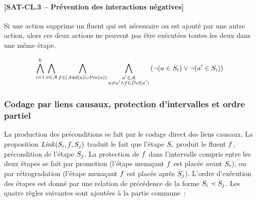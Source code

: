 {%

\paragraph*{[SAT-CL.3 -- Prévention des interactions négatives]}
Si une action supprime un fluent qui est nécessaire ou est ajouté par une autre action, alors ces deux actions ne peuvent pas être exécutées toutes les deux dans une même étape.

\begin{small}
\[
\bigwedge\limits_{\substack{i=1}}^{k}\bigwedge\limits_{\substack{\substack{a\in \mathcal{A}}}}\bigwedge\limits_{\substack{\substack{f\in \left(\mathit{Add}(a)\cup\mathit{Pre}(a)\right)}}}\bigwedge\limits_{\substack{\substack{a'\in \mathcal{A}\\a \neq a' \wedge f \in \mathit{Del}(a')}}}\left(\neg (a \in S_{i}) \vee \neg (a' \in S_{i})\right)
\]
\end{small}

\subsubsection{Codage par liens causaux, protection d'intervalles et ordre partiel}

La production des préconditions se fait par le codage direct des liens causaux.
La proposition $\mathit{Link}(S_{i},f,S_{j})$ traduit le fait que l'étape $S_{i}$ produit le fluent
$f$, précondition de l'étape $S_{j}$. La protection de $f$ dans l'intervalle compris
entre les deux étapes se fait par promotion (l'étape menaçant $f$ est placée
avant $S_{i}$), ou par rétrogradation (l'étape menaçant $f$ est placée après $S_{j}$).
L'ordre d'exécution des étapes  est donné par une relation de précédence de
la forme $S_{i} \prec S_{j}$. Les quatre règles suivantes sont ajoutées à la partie commune~:

}
